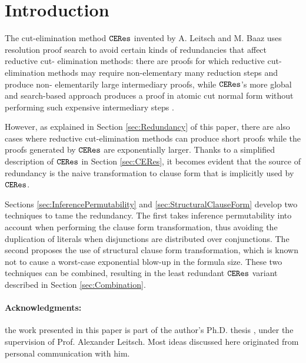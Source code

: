 \section{Introduction}

The cut-elimination method $\texttt{CERes}$ invented by A. Leitsch and M.
Baaz
\cite{BaazLeitsch1999MethodsofCut-Elimination,BaazLeitsch2000Cut-eliminationandRedundancy-eliminationbyResolution,BaazLeitsch2006Towardsaclausalanalysisofcut-elimination} 
uses resolution
proof search to avoid certain kinds of redundancies that affect reductive cut-
elimination methods: there are proofs for which reductive cut-elimination
methods may require non-elementary many reduction steps and produce non-
elementarily large intermediary proofs, while $\texttt{CERes}$'s more global and
search-based approach produces a proof in atomic cut normal form without
performing such expensive intermediary steps 
\cite{BaazLeitsch2009MethodsofCut-Elimination}.

However, as explained in Section \ref{sec:Redundancy} of this paper, there are
also cases where reductive cut-elimination methods can produce short proofs
while the proofs generated by $\texttt{CERes}$ are exponentially larger. Thanks to a
simplified description of $\texttt{CERes}$ in Section \ref{sec:CERes}, it becomes
evident that the source of redundancy is the naive transformation to clause
form that is implicitly used by $\texttt{CERes}$.

Sections \ref{sec:InferencePermutability} and \ref{sec:StructuralClauseForm}
develop two techniques to tame the redundancy. The first takes inference
permutability into account when performing the clause form transformation,
thus avoiding the duplication of literals when disjunctions are distributed
over conjunctions. The second proposes the use of structural clause form
transformation, which is known not to cause a worst-case exponential blow-up
in the formula size. These two techniques can be combined, resulting
in the least redundant $\texttt{CERes}$ variant described in Section
\ref{sec:Combination}.

\paragraph{Acknowledgments:} the work presented in this paper is part of the
author's Ph.D. thesis
\cite{Woltzenlogel-Paleo2009A-General-Analysis-of-Cut-Elimination-by-CERes},
under the supervision of Prof. Alexander Leitsch.  Most
ideas discussed here originated from personal communication with him.
